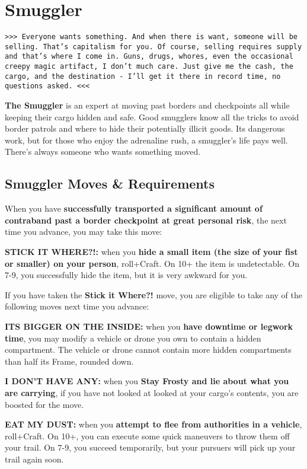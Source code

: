 \documentclass[oneside,10pt]{article}
\begin{document}
\section{Smuggler}
\begin{multicols}{2}

\texttt{>>> Everyone wants something. And when
  there is want, someone will be selling. That's
  capitalism for you. Of course, selling requires
  supply and that's where I come in. Guns, drugs,
  whores, even the occasional creepy magic
  artifact, I don't much care. Just give me the
  cash, the cargo, and the destination - I'll get
  it there in record time, no questions asked. <<<}

\textbf{The Smuggler} is an expert at moving past
borders and checkpoints all while keeping their
cargo hidden and safe. Good smugglers know all the
tricks to avoid border patrols and where to hide
their potentially illicit goods. Its dangerous
work, but for those who enjoy the adrenaline
rush, a smuggler's life pays well. There's always
someone who wants something moved.

\subsection{Smuggler Moves \& Requirements}

When you have \textbf{successfully transported a
  significant amount of contraband past a border
  checkpoint at great personal risk}, the next
time you advance, you may take this move:

\textbf{STICK IT WHERE?!:} when you \textbf{hide a
  small item (the size of your fist or smaller) on
  your person}, roll+Craft. On 10+ the item is
undetectable. On 7-9, you successfully hide the
item, but it is very awkward for you.

If you have taken the \textbf{Stick it Where?!}
move, you are eligible to take any of the
following moves next time you advance:

\textbf{ITS BIGGER ON THE INSIDE:} when you \textbf{have
  downtime or legwork time}, you may modify a
vehicle or drone you own to contain a hidden
compartment. The vehicle or drone cannot contain
more hidden compartments than half its Frame,
rounded down.

\textbf{I DON'T HAVE ANY:} when you \textbf{Stay
  Frosty and lie
  about what you are carrying}, if you have not
looked at looked at your cargo's contents, you are
boosted for the move.

\textbf{EAT MY DUST:} when you \textbf{attempt to
  flee from authorities in a vehicle},
roll+Craft. On 10+, you can execute some quick
maneuvers to throw them off your trail. On 7-9,
you succeed temporarily, but your pursuers will pick up your
trail again soon.


\end{multicols}
\end{document}
